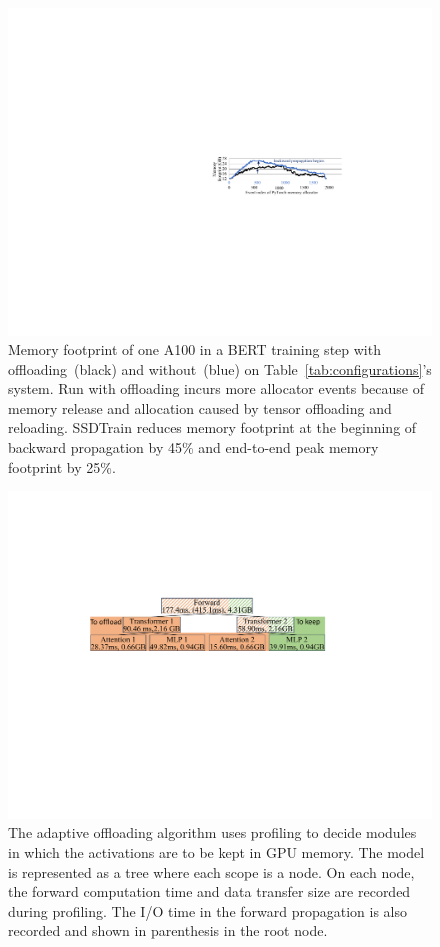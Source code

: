 \begin{figure}[!t]
\centering
\includegraphics[width=0.9\linewidth]{figures/SSDTrain/snapshot_aligned_2.pdf}
\caption{\label{fig:snapshot} Memory footprint of one A100 in a BERT training step with offloading~(black) and without~(blue) on Table~\ref{tab:configurations}'s system. Run with offloading incurs more allocator events because of memory release and allocation caused by tensor offloading and reloading. SSDTrain reduces memory footprint at the beginning of backward propagation by 45\% and end-to-end peak memory footprint by 25\%.}
\end{figure}


\begin{figure}[!t]
\centering
\includegraphics[width=0.95\linewidth]{figures/SSDTrain/adaptive.pdf}
\caption{\label{fig:adaptive} The adaptive offloading algorithm uses profiling to decide modules in which the activations are to be kept in GPU memory. The model is represented as a tree where each scope is a node. On each node, the forward computation time and data transfer size are recorded during profiling. The I/O time in the forward propagation is also recorded and shown in parenthesis in the root node.}
\end{figure}


